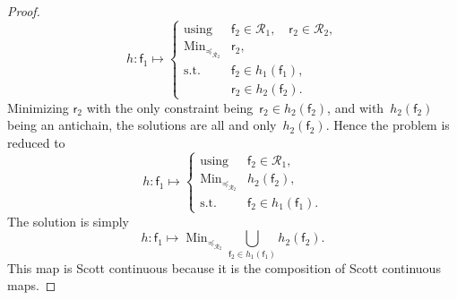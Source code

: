 \documentclass[twocolumn,english]{IEEEtran}
\theoremstyle{definition}
\theoremstyle{plain}
\theoremstyle{definition}
\theoremstyle{remark}
\theoremstyle{definition}
\theoremstyle{plain}
\theoremstyle{plain}
\newcommand{\aword}[1]{\mathsf{#1}}
\newcommand{\vmath}[1]{\aword{#1}}
\newcommand{\subto}{\text{s.t.}}
\newcommand{\with}{\text{using}}
\DeclareMathOperator*{\Min}{Min}
\newcommand{\posleq}{\preceq}
\newcommand{\ftor}{{h}}
\newcommand{\fun}{\vmath{f}}
\newcommand{\res}{\vmath{r}}
\newcommand{\ressp}{\mathscr{R}}
\newcommand{\scottcontinuous}{Scott continuous\xspace}
\begin{document}
\begin{proof}
\begin{equation}
\ftor:\fun_{1}\mapsto\begin{cases}
\with & \fun_{2}\in\ressp_{1},\quad\res_{2}\in\ressp_{2},\\
\Min_{\posleq_{\ressp_{2}}} & \res_{2},\\
\subto & \fun_{2}\in\ftor_{1}(\fun_{1}),\\
 & \res_{2}\in\ftor_{2}(\fun_{2}).
\end{cases}\label{eq:dede-2}
\end{equation}
Minimizing $\res_{2}$ with the only constraint being~$\res_{2}\in\ftor_{2}(\fun_{2})$,
and with~$\ftor_{2}(\fun_{2})$ being an antichain, the solutions
are all and only~$\ftor_{2}(\fun_{2})$. Hence the problem is reduced
to
\begin{equation}
\ftor:\fun_{1}\mapsto\begin{cases}
\with & \fun_{2}\in\ressp_{1},\\
\Min_{\posleq_{\ressp_{2}}} & \ftor_{2}(\fun_{2}),\\
\subto & \fun_{2}\in\ftor_{1}(\fun_{1}).
\end{cases}\label{eq:dede-2-1}
\end{equation}
The solution is simply
\begin{equation}
\ftor:\fun_{1}\mapsto\Min_{\posleq_{\ressp_{2}}}\bigcup_{\fun_{2}\in\ftor_{1}(\fun_{1})}\ftor_{2}(\fun_{2}).\label{eq:ora}
\end{equation}
This map is \scottcontinuous because it is the composition of \scottcontinuous
maps.
\end{proof}
\end{document}
